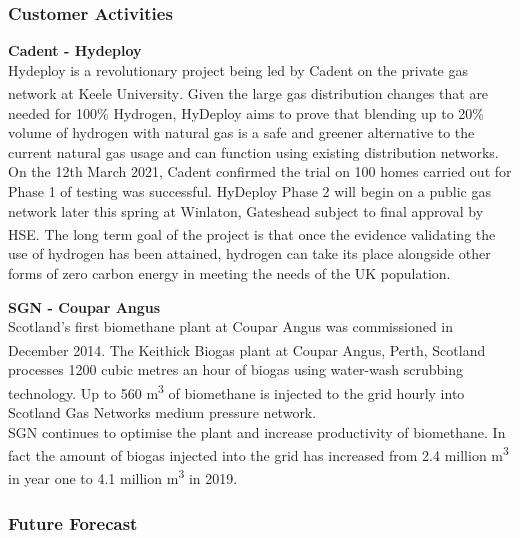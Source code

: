 \documentclass[11pt]{article}		%
\newcommand{\supercite}[1]{\textsuperscript{\cite{#1}}}		%
\begin{document}
    		\subsubsection{Customer Activities}%
    		
    		\textbf{Cadent - Hydeploy}
    		\\
            Hydeploy is a revolutionary project being led by Cadent on the private gas network at Keele University\supercite{whatishydeploy}. Given the large gas distribution changes that are needed for 100\% Hydrogen, HyDeploy aims to prove that blending up to 20\% volume of hydrogen with natural gas is a safe and greener alternative to the current natural gas usage and can function using existing distribution networks.
            \\
            \hspace*{2ex}On the 12th March 2021, Cadent confirmed the trial on 100 homes carried out for Phase 1 of testing was successful. HyDeploy Phase 2 will begin on a public gas network later this spring at Winlaton, Gateshead subject to final approval by HSE\supercite{hydeploy}. The long term goal of the project is that once the evidence validating the use of hydrogen has been attained, hydrogen can take its place alongside other forms of zero carbon energy in meeting the needs of the UK population.
    
    		\textbf{SGN - Coupar Angus}
    		\\
            Scotland’s first biomethane plant at Coupar Angus was commissioned in December 2014\supercite{coupar}. The Keithick Biogas plant at Coupar Angus, Perth, Scotland processes 1200 cubic metres an hour of biogas using water-wash scrubbing technology. Up to 560 m\textsuperscript{3}  of biomethane is injected to the grid hourly into Scotland Gas Networks medium pressure network.
            \\
    	    \hspace*{2ex}SGN continues to optimise the plant and increase productivity of biomethane. In fact the amount of biogas injected into the grid has increased from 2.4 million m\textsuperscript{3} in year one to 4.1 million m\textsuperscript{3} in 2019\supercite{CAperforamnce}.
    
    		\subsubsection[Future Forecast]{Future Forecast} \label{futureForecast}
    		
\end{document}
